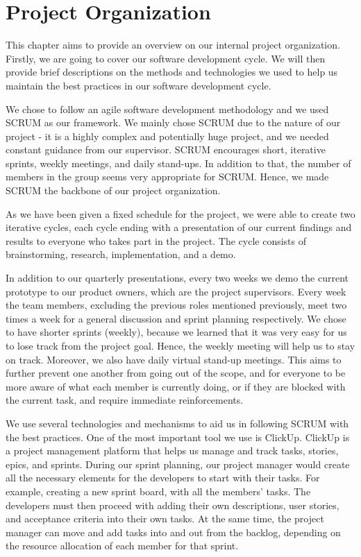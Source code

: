 \section{Project Organization}

This chapter aims to provide an overview on our internal project organization. Firstly, we are going to cover our software development cycle. We will then provide brief descriptions on the methods and technologies we used to help us maintain the best practices in our software development cycle. 

We chose to follow an agile software development methodology and we used SCRUM as our framework. We mainly chose SCRUM due to the nature of our project - it is a highly complex and potentially huge project, and we needed constant guidance from our supervisor. SCRUM encourages short, iterative sprints, weekly meetings, and daily stand-ups. In addition to that, the number of members in the group seems very appropriate for SCRUM. Hence, we made SCRUM the backbone of our project organization. 

As we have been given a fixed schedule for the project, we were able to create two iterative cycles, each cycle ending with a presentation of our current findings and results to everyone who takes part in the project. The cycle consists of brainstorming, research, implementation, and a demo. 

In addition to our quarterly presentations, every two weeks we demo the current prototype to our product owners, which are the project supervisors. Every week the team members, excluding the previous roles mentioned previously, meet two times a week for a general discussion and sprint planning respectively. We chose to have shorter sprints (weekly), because we learned that it was very easy for us to lose track from the project goal. Hence, the weekly meeting will help us to stay on track. Moreover, we also have daily virtual stand-up meetings. This aims to further prevent one another from going out of the scope, and for everyone to be more aware of what each member is currently doing, or if they are blocked with the current task, and require immediate reinforcements. 

We use several technologies and mechanisms to aid us in following SCRUM with the best practices. One of the most important tool we use is ClickUp. ClickUp is a project management platform that helps us manage and track tasks, stories, epics, and sprints. During our sprint planning, our project manager would create all the necessary elements for the developers to start with their tasks. For example, creating a new sprint board, with all the members' tasks. The developers must then proceed with adding their own descriptions, user stories, and acceptance criteria into their own tasks. At the same time, the project manager can move and add tasks into and out from the backlog, depending on the resource allocation of each member for that sprint. 

